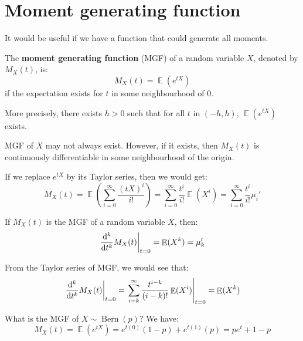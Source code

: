 \documentclass{huhtakm-template-book-v2}
\DeclareMathOperator{\E}{\mathbb{E}}
\DeclareMathOperator{\Bern}{Bern}
\begin{document}
\section{Moment generating function}
It would be useful if we have a function that could generate all moments.
\begin{defn}
	The \textbf{moment generating function} (MGF) of a random variable $X$, denoted by $M_{X}(t)$, is:
	\begin{equation*}
		M_{X}(t)=\E(e^{tX})
	\end{equation*}
	if the expectation exists for $t$ in some neighbourhood of $0$.
\end{defn}
\begin{rem}
	More precisely, there exists $h>0$ such that for all $t$ in $(-h,h)$, $\E(e^{tX})$ exists.
\end{rem}
\begin{rem}
	MGF of $X$ may not always exist. However, if it exists, then $M_{X}(t)$ is continuously differentiable in some neighbourhood of the origin.
\end{rem}
\begin{rem}
	If we replace $e^{tX}$ by its Taylor series, then we would get:
	\begin{equation*}
		M_{X}(t)=\E\left(\sum_{i=0}^{\infty}\frac{(tX)^{i}}{i!}\right)=\sum_{i=0}^{\infty}\frac{t^{i}}{i!}\E(X^{i})=\sum_{i=0}^{\infty}\frac{t^{i}}{i!}\mu_{i}'
	\end{equation*}
\end{rem}
\begin{lem}
	If $M_{X}(t)$ is the MGF of a random variable $X$, then:
	\begin{equation*}
		\left.\odv*[order={k}]{M_{X}(t)}{t}\right|_{t=0}=\E(X^{k})=\mu_{k}'
	\end{equation*}
\end{lem}
\begin{proofing}
	From the Taylor series of MGF, we would see that:
	\begin{equation*}
		\left.\odv*[order={k}]{M_{X}(t)}{t}\right|_{t=0}=\left.\sum_{i=k}^{\infty}\frac{t^{i-k}}{(i-k)!}\E(X^{i})\right|_{t=0}=\E(X^{k})
	\end{equation*}
\end{proofing}
\begin{eg}
	What is the MGF of $X\sim\Bern(p)$? We have:
	\begin{equation*}
		M_{X}(t)=\E(e^{tX})=e^{t(0)}(1-p)+e^{t(1)}(p)=pe^{t}+1-p
	\end{equation*}
\end{eg}
\end{document}
